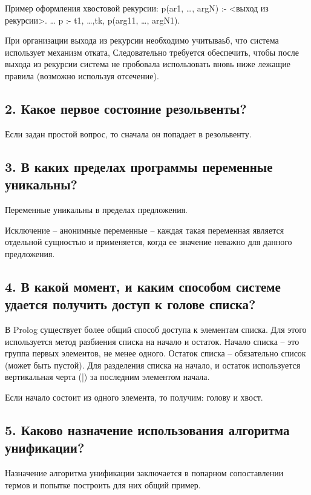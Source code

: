 \documentclass[a4paper,12pt]{article}
\begin{document}
Пример оформления хвостовой рекурсии:
p(ar1, …, argN) :-  <выход из рекурсии>.
…
p :- t1, …,tk, p(arg11, …, argN1).

При организации выхода из рекурсии необходимо учитываьб, что система использует механизм отката, Следовательно требуется обеспечить, чтобы после выхода из рекурсии система не пробовала использовать вновь ниже лежащие правила (возможно используя отсечение).

\subsection*{2.	Какое первое состояние резольвенты?}

Если задан простой вопрос, то сначала он попадает в резольвенту.

\subsection*{3.	В каких пределах программы переменные уникальны? }

Переменные уникальны в пределах предложения.

Исключение – анонимные переменные – каждая такая переменная является отдельной сущностью и применяется, когда ее значение неважно для данного предложения.

\subsection*{4.	В какой момент, и каким способом системе удается получить доступ к голове списка?}

В Prolog существует более общий способ доступа к элементам списка. Для этого используется метод разбиения списка на начало и остаток. Начало списка – это группа первых элементов, не менее одного. Остаток списка – обязательно список (может быть пустой). Для разделения списка на начало, и остаток используется вертикальная черта (|) за последним элементом начала.

Если начало состоит из одного элемента, то получим: голову и хвост.

\subsection*{5.	Каково назначение использования алгоритма унификации?}

Назначение алгоритма унификации заключается в попарном сопоставлении термов и попытке построить для них общий пример. 
\end{document}
